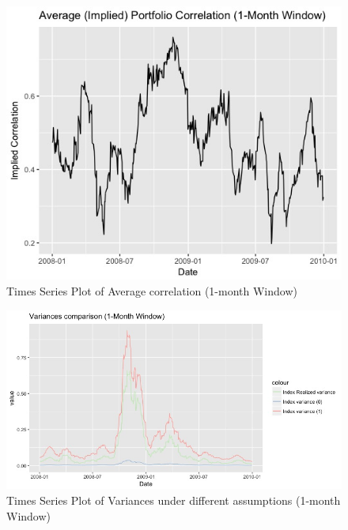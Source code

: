 \documentclass[10pt]{article}
\begin{document}
\begin{enumerate}
\begin{enumerate}
        \begin{figure}[htbp]
            \centering
            \includegraphics[scale = 0.7]{Q5_rho_1m.jpeg}
            \caption{Times Series Plot of Average correlation (1-month Window)}
        \end{figure}
        
        \begin{figure}[htbp]
            \centering
            \includegraphics[scale = 0.5]{Q5_var_1m.jpeg}
            \caption{Times Series Plot of Variances under different assumptions (1-month Window)}
        \end{figure}
        

\end{enumerate}
\end{enumerate}
\end{document}
